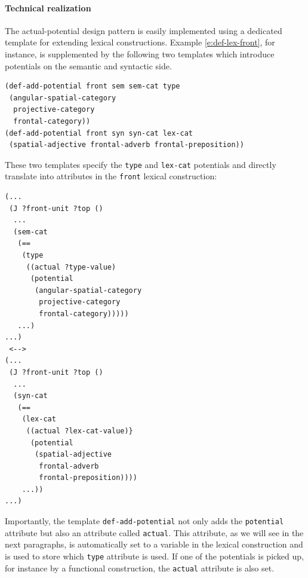\paragraph*{Technical realization}
The actual-potential design pattern is easily implemented
using a dedicated template for extending lexical constructions.
Example \ref{e:def-lex-front}, for instance, is supplemented by the following two 
templates which introduce potentials on the semantic and syntactic side.
\begin{example}
\label{e:def-lex-front-potentials}
\begin{footnotesize}
\begin{Verbatim}[commandchars=\\\{\},fontsize=\footnotesize]
(def-add-potential front sem sem-cat type 
 (angular-spatial-category 
  projective-category 
  frontal-category))
(def-add-potential front syn syn-cat lex-cat 
 (spatial-adjective frontal-adverb frontal-preposition))
\end{Verbatim}
\end{footnotesize}
\end{example}
These two templates specify the {\footnotesize\tt type} and 
{\footnotesize\tt lex-cat} potentials and directly translate into 
attributes in the {\footnotesize\tt front} lexical construction:
\begin{example}
\label{e:def-lex-front-cxn}
\begin{footnotesize}
\begin{Verbatim}[]
(...
 (J ?front-unit ?top ()
  ...
  (sem-cat 
   (== 
    (type 
     ((actual ?type-value)
      (potential 
       (angular-spatial-category 
        projective-category 
        frontal-category)))))
   ...)
...)
 <-->
(...
 (J ?front-unit ?top ()
  ...
  (syn-cat 
   (== 
    (lex-cat
     ((actual ?lex-cat-value)}
      (potential 
       (spatial-adjective 
        frontal-adverb 
        frontal-preposition))))
    ...))
...)
\end{Verbatim}
\end{footnotesize}
\end{example}
Importantly, the template {\footnotesize\tt def-add-potential} 
not only adds the {\footnotesize\tt potential} attribute but also an 
attribute called {\footnotesize\tt actual}. This attribute, as we will
see in the next paragraphs, is automatically set to a variable 
in the lexical construction and is used to store which 
{\footnotesize\tt type} attribute is used. If one of the potentials 
is picked up, for instance by a functional construction, the 
{\footnotesize\tt actual} attribute is also set.

